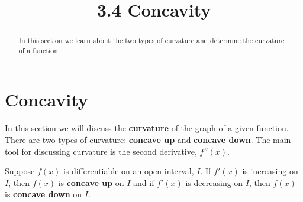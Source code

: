 \documentclass[handout]{ximera}
\title{3.4 Concavity}
\begin{document}
\begin{abstract}
In this section we learn about the two types of curvature and determine the curvature of a function.
\end{abstract}

\maketitle

\section{Concavity}

In this section we will discuss the {\bf curvature} of the graph of a given function. 
There are two types of curvature: {\bf concave up} and {\bf concave down}.  
The main tool for discussing curvature is the second derivative, $f''(x)$.





\begin{definition}[Concavity]
Suppose $f(x)$ is differentiable on an open interval, $I$.
If $f'(x)$ is increasing on $I$, then $f(x)$ is \textbf{concave up} on $I$ and
if $f'(x)$ is decreasing on $I$, then $f(x)$ is \textbf{concave down} on $I$.
\end{definition} 


\begin{image}
\end{image}


\end{document}
